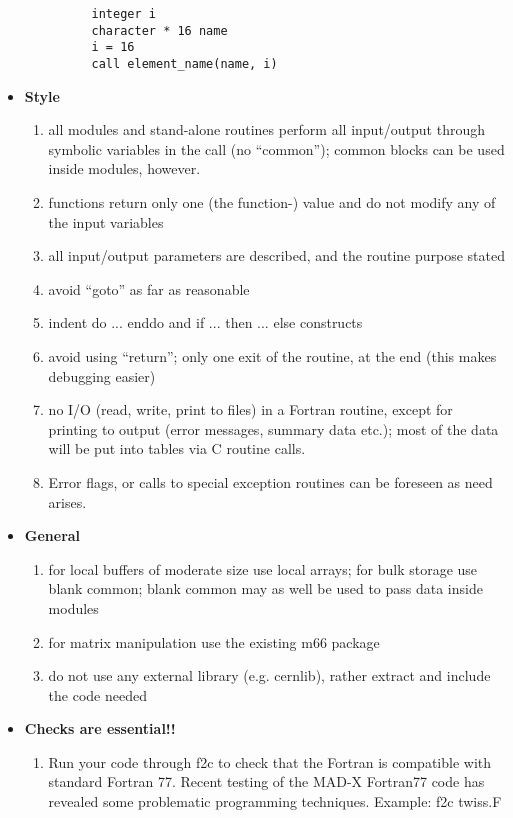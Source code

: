 \begin{itemize}
\begin{enumerate}
\begin{verbatim}
      integer i
      character * 16 name
      i = 16
      call element_name(name, i)
\end{verbatim}
\end{enumerate}
	\item \textbf{ Style}
\begin{enumerate}
	\item all modules and stand-alone routines perform all input/output         through symbolic variables in the call (no ``common'');         common blocks can be used inside modules, however.
	\item functions return only one (the function-) value and do not         modify any of the input variables
	\item all input/output parameters are described, and the routine     purpose stated
	\item avoid ``goto'' as far as reasonable
	\item indent do ... enddo and if ... then ... else constructs
	\item avoid using ``return'';         only one exit of the routine, at the end (this makes          debugging easier)  
	\item no I/O (read, write, print to files) in a Fortran routine, except         for printing to output (error messages, summary data etc.);         most of the data will be put into tables via C routine calls.
	\item     Error flags, or calls to special exception routines          can be foreseen as need arises.
\end{enumerate}
	\item \textbf{ General}
\begin{enumerate}
	\item for local buffers of moderate size use local arrays; for bulk         storage use blank common; blank common may as well be used to         pass data inside modules
	\item for matrix manipulation use the existing m66 package
	\item do not use any external library (e.g. cernlib), rather extract         and include the code needed  
\end{enumerate}
	\item \textbf{ Checks are essential!!}
\begin{enumerate}
	\item  Run your code through f2c to check that the Fortran is compatible with standard Fortran 77. Recent testing of the MAD-X Fortran77 code has  revealed some problematic programming techniques. Example: f2c twiss.F  

\end{enumerate}
\end{itemize}
